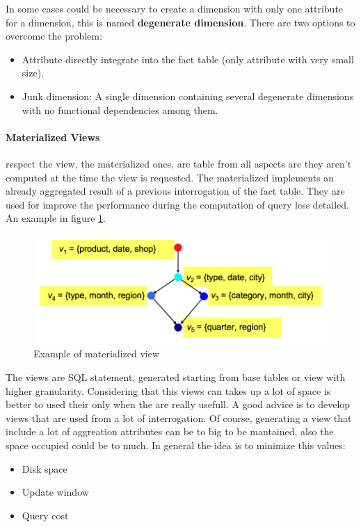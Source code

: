 \documentclass[12pt]{article}
\begin{document}
In some cases could be necessary to create a dimension with only one attribute for a dimension, this is named \textbf{degenerate dimension}. There are two options to overcome the problem:
\begin{itemize}
  \item Attribute directly integrate into the fact table (only attribute with very small size).
  \item Junk dimension: A single dimension containing several degenerate dimensions with no functional dependencies among them.
\end{itemize}

\paragraph{Materialized Views} respect the view, the materialized ones, are table from all aspects are they aren't computed at the time the view is requested. The materialized implements an already aggregated result of a previous interrogation of the fact table. They are used for improve the performance during the computation of query less detailed. An example in figure \ref{fig:matview}.
\begin{figure}[h!]
  \includegraphics[width=\linewidth]{images/matview.png}
  \caption{Example of materialized view}
  \label{fig:matview}
\end{figure}
The views are SQL statement,  generated starting from base tables or view with higher granularity. Considering that this views can takes up a lot of space is better to used their only when the are really usefull. A good advice is to develop views that are used from a lot of interrogation. Of course, generating a view that include a lot of aggreation attributes can be to big to be mantained, also the space occupied could be to much. In general the idea is to minimize this values:
\begin{itemize}
  \item Disk space
  \item Update window
  \item Query cost
\end{itemize}
\end{document}
